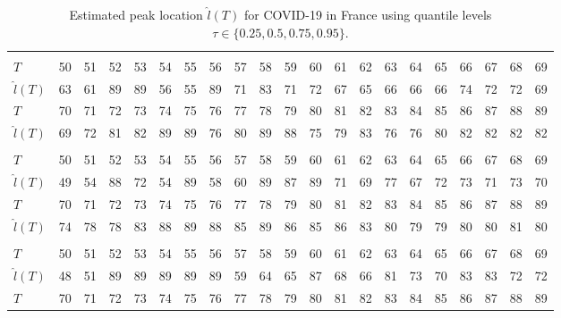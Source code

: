\documentclass[12pt,a4paper]{article}
\begin{document}
\begin{landscape}
	\begin{table}[htbp]
		\caption{Estimated peak location $\hat{l}(T)$ for COVID-19 in France using quantile levels $\tau\in\{0.25,0.5,0.75,0.95\}$.}
		\label{tab:france_tau}
		\begin{tabular*}{\linewidth}{@{\extracolsep{\fill}}lrrrrrrrrrrrrrrrrrrrr}
			\toprule
			\addlinespace[2.5pt]
			\multicolumn{21}{c}{\textbf{$\tau=0.25,\ T_{\mathrm{stab}}=85,\ \varepsilon=5$}} \\
			\addlinespace[2.5pt]
			\midrule
			$T$ & 50 & 51 & 52 & 53 & 54 & 55 & 56 & 57 & 58 & 59 & 60 & 61 & 62 & 63 & 64 & 65 & 66 & 67 & 68 & 69 \\
			$\hat{l}(T)$ & 63 & 61 & 89 & 89 & 56 & 55 & 89 & 71 & 83 & 71 & 72 & 67 & 65 & 66 & 66 & 66 & 74 & 72 & 72 & 69 \\
			$T$ & 70 & 71 & 72 & 73 & 74 & 75 & 76 & 77 & 78 & 79 & 80 & 81 & 82 & 83 & 84 & 85 & 86 & 87 & 88 & 89 \\
			$\hat{l}(T)$ & 69 & 72 & 81 & 82 & 89 & 89 & 76 & 80 & 89 & 88 & 75 & 79 & 83 & 76 & 76 & 80 & 82 & 82 & 82 & 82 \\
			\midrule\addlinespace[2.5pt]
			\multicolumn{21}{c}{\textbf{$\tau=0.5,\ T_{\mathrm{stab}}=82,\ \varepsilon=5$}} \\
			\addlinespace[2.5pt]
			\midrule
			$T$ & 50 & 51 & 52 & 53 & 54 & 55 & 56 & 57 & 58 & 59 & 60 & 61 & 62 & 63 & 64 & 65 & 66 & 67 & 68 & 69 \\
			$\hat{l}(T)$ & 49 & 54 & 88 & 72 & 54 & 89 & 58 & 60 & 89 & 87 & 89 & 71 & 69 & 77 & 67 & 72 & 73 & 71 & 73 & 70 \\
			$T$ & 70 & 71 & 72 & 73 & 74 & 75 & 76 & 77 & 78 & 79 & 80 & 81 & 82 & 83 & 84 & 85 & 86 & 87 & 88 & 89 \\
			$\hat{l}(T)$ & 74 & 78 & 78 & 83 & 88 & 89 & 88 & 85 & 89 & 86 & 85 & 86 & 83 & 80 & 79 & 79 & 80 & 80 & 81 & 80 \\
			\midrule\addlinespace[2.5pt]
			\multicolumn{21}{c}{\textbf{$\tau=0.75,\ T_{\mathrm{stab}}=80,\ \varepsilon=5$}} \\
			\addlinespace[2.5pt]
			\midrule
			$T$ & 50 & 51 & 52 & 53 & 54 & 55 & 56 & 57 & 58 & 59 & 60 & 61 & 62 & 63 & 64 & 65 & 66 & 67 & 68 & 69 \\
			$\hat{l}(T)$ & 48 & 51 & 89 & 89 & 89 & 89 & 89 & 59 & 64 & 65 & 87 & 68 & 66 & 81 & 73 & 70 & 83 & 83 & 72 & 72 \\
			$T$ & 70 & 71 & 72 & 73 & 74 & 75 & 76 & 77 & 78 & 79 & 80 & 81 & 82 & 83 & 84 & 85 & 86 & 87 & 88 & 89 \\

\end{tabular*}
\end{table}
\end{landscape}
\end{document}

